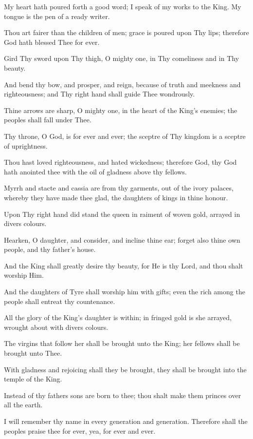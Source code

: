 My heart hath poured forth a good word; I speak of my works to the King. My tongue is the pen of a ready writer.

Thou art fairer than the children of men; grace is poured upon Thy lips; therefore God hath blessed Thee for ever.

Gird Thy sword upon Thy thigh, O mighty one, in Thy comeliness and in Thy beauty.

And bend thy bow, and prosper, and reign, because of truth and meekness and righteousness; and Thy right hand shall guide Thee wondrously.

Thine arrows are sharp, O mighty one, in the heart of the King’s enemies; the peoples shall fall under Thee.

Thy throne, O God, is for ever and ever; the sceptre of Thy kingdom is a sceptre of uprightness.

Thou hast loved righteousness, and hated wickedness; therefore God, thy God hath anointed thee with the oil of gladness above thy fellows.

Myrrh and stacte and cassia are from thy garments, out of the ivory palaces, whereby they have made thee glad, the daughters of kings in thine honour.

Upon Thy right hand did stand the queen in raiment of woven gold, arrayed in divers colours.

Hearken, O daughter, and consider, and incline thine ear; forget also thine own people, and thy father's house.

And the King shall greatly desire thy beauty, for He is thy Lord, and thou shalt worship Him.

And the daughters of Tyre shall worship him with gifts; even the rich among the people shall entreat thy countenance.

All the glory of the King’s daughter is within; in fringed gold is she arrayed, wrought about with divers colours.

The virgins that follow her shall be brought unto the King; her fellows shall be brought unto Thee.

With gladness and rejoicing shall they be brought, they shall be brought into the temple of the King.

Instead of thy fathers sons are born to thee; thou shalt make them princes over all the earth.

I will remember thy name in every generation and generation. Therefore shall the peoples praise thee for ever, yea, for ever and ever.
